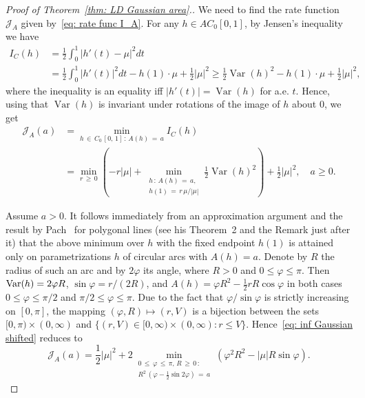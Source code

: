 \documentclass[AHL,Unicode,published]{cedram}
\newcommand{\Jcl}{\mathcal{J}}
\newcommand{\Var}{\mathop{\mathrm{Var}}\nolimits}
\begin{document}
\begin{proof}[Proof of Theorem~\ref{thm: LD Gaussian area}.]
We need to find the rate function $\Jcl_A$ given by~\eqref{eq: rate func I_A}. For any $h \in AC_0[0,1]$, by Jensen's inequality we have
\begin{align*}
I_C(h)& = \frac12 \int_0^1 \left|h'(t)-\mu\right|^2 dt \\
&= \frac12 \int_0^1\left|h'(t)\right|^2 dt - h(1) \cdot \mu + \frac12 |\mu|^2 
\ge \frac12 \Var(h)^2 - h(1) \cdot \mu + \frac12 |\mu|^2,
\end{align*}
where the inequality is an equality iff $|h'(t)|=\Var(h)$ for a.e. $t$. Hence, using that $\Var(h)$ is invariant under rotations of the image of $h$ about $0$, we get
\begin{equation}\label{eq: inf Gaussian shifted}
\begin{aligned}
\Jcl_A(a) &= \min_{h\,\in\,C_0\,[0,\,1]\,:\,A(h)\,=\,a} I_C(h) \\
&= \min_{r\,\ge\,0} \left(- r |\mu| + \min_{\substack{h\,:\,A(h)\,=\,a,\\
h(1)\,=\,r\,\mu / |\mu|}} \frac12 \Var(h)^2 \right) + \frac12 |\mu|^2, \quad a \ge 0.
\end{aligned}
\end{equation}

Assume $a>0$. It follows immediately from an approximation argument and the result by Pach~\cite{pach1978isoperimetric} for polygonal lines (see his Theorem~2 and the Remark just after it) that the above minimum over $h$ with the fixed endpoint $h(1)$ is attained only on parametrizations $h$ of circular arcs with $A(h)=a$. Denote by $R$ the radius of such an arc and by $2 \varphi$ its angle, where $R>0$ and $0 \le \varphi \le \pi$. Then $\Var(h)\linebreak= 2 \varphi R$, $\sin \varphi = r/(2 R)$, and $A(h)= \varphi R^2 - \frac12 r R \cos \varphi$ in both cases $0 \le \varphi \le \pi/2$ and $\pi/2 \le \varphi \le \pi$. Due to the fact that $\varphi / \sin \varphi$ is strictly increasing on $[0, \pi]$, the mapping $(\varphi, R) \mapsto (r, V)$ is a bijection between the sets $[0, \pi) \times (0,\infty)$ and $\{(r, V) \in [0, \infty) \times (0, \infty): r \le V \}$. Hence~\eqref{eq: inf Gaussian shifted} reduces to
\begin{equation}\label{eq: minimization}
\Jcl_A(a) =\frac12 |\mu|^2 + 2 \min_{\substack{0\,\le\,\varphi \,\le\,\pi,\,R\,\ge\,0\,: \\ R^2\,\left(\varphi - \frac12 \sin 2 \varphi\right)\,=\,a}} \left(\varphi^2 R^2 - |\mu| R \sin \varphi \right).
\end{equation}


\end{proof}
\end{document}
